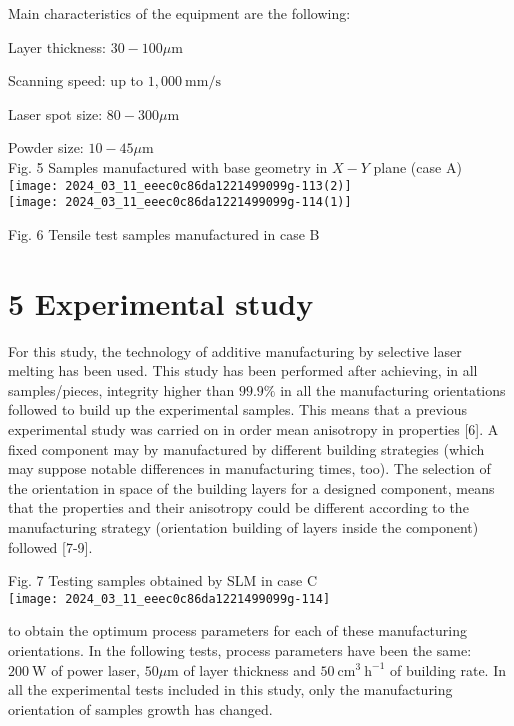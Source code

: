 \documentclass[10pt]{article}
\begin{document}
Main characteristics of the equipment are the following:

Layer thickness: $30-100 \mu \mathrm{m}$

Scanning speed: up to $1,000 \mathrm{~mm} / \mathrm{s}$

Laser spot size: $80-300 \mu \mathrm{m}$

Powder size: $10-45 \mu \mathrm{m}$\\
Fig. 5 Samples manufactured with base geometry in $X-Y$ plane (case A)\\
\texttt{[image: 2024\_03\_11\_eeec0c86da1221499099g-113(2)]}\\
\texttt{[image: 2024\_03\_11\_eeec0c86da1221499099g-114(1)]}

Fig. 6 Tensile test samples manufactured in case B

\section*{5 Experimental study}
For this study, the technology of additive manufacturing by selective laser melting has been used. This study has been performed after achieving, in all samples/pieces, integrity higher than $99.9 \%$ in all the manufacturing orientations followed to build up the experimental samples. This means that a previous experimental study was carried on in order mean anisotropy in properties [6]. A fixed component may by manufactured by different building strategies (which may suppose notable differences in manufacturing times, too). The selection of the orientation in space of the building layers for a designed component, means that the properties and their anisotropy could be different according to the manufacturing strategy (orientation building of layers inside the component) followed [7-9].

Fig. 7 Testing samples obtained by SLM in case $\mathrm{C}$\\
\texttt{[image: 2024\_03\_11\_eeec0c86da1221499099g-114]}

to obtain the optimum process parameters for each of these manufacturing orientations. In the following tests, process parameters have been the same: $200 \mathrm{~W}$ of power laser, $50 \mu \mathrm{m}$ of layer thickness and $50 \mathrm{~cm}^{3} \mathrm{~h}^{-1}$ of building rate. In all the experimental tests included in this study, only the manufacturing orientation of samples growth has changed.
\end{document}
